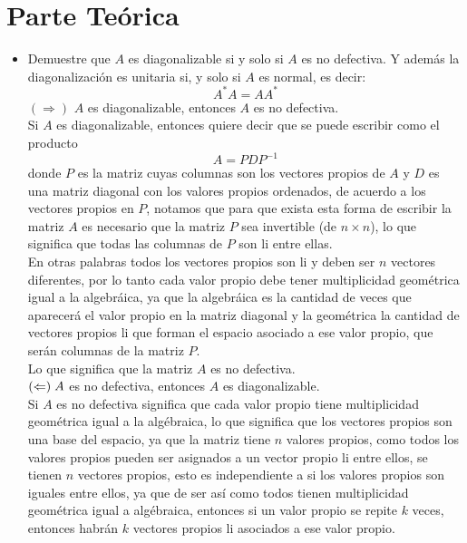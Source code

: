 \documentclass{article}
\begin{document}
\section*{Parte Teórica}
\begin{itemize}
\item Demuestre que $A$ es diagonalizable si y solo si $A$ es no defectiva. Y además la diagonalización es unitaria si, y solo si $A$ es normal, es decir:
$$A^{*}A = AA^{*} $$
\((\Rightarrow)\)
$A$ es diagonalizable, entonces $A$ es no defectiva.\\
Si $A$ es diagonalizable, entonces quiere decir que se puede escribir como el producto 
\[A = PDP^{-1}\]
donde $P$ es la matriz cuyas columnas son los vectores propios de $A$ y $D$ es una matriz diagonal con los valores propios ordenados, de acuerdo a los vectores propios en $P$, notamos que para que exista esta forma de escribir la matriz $A$ es necesario que la matriz $P$ sea invertible (de $n\times n$), lo que significa que todas las columnas de $P$ son li entre ellas.\\

En otras palabras todos los vectores propios son li y deben ser $n$ vectores diferentes, por lo tanto cada valor propio debe tener multiplicidad geométrica igual a la algebráica, ya que la algebráica es la cantidad de veces que aparecerá el valor propio en la matriz diagonal y la geométrica la cantidad de vectores propios li que forman el espacio asociado a ese valor propio, que serán columnas de la matriz $P$.\\
Lo que significa que la matriz $A$ es no defectiva.\\

\((\Leftarrow)\hspace*{1mm} A\) es no defectiva, entonces $A$ es diagonalizable.\\

Si $A$ es no defectiva significa que cada valor propio tiene multiplicidad geométrica igual a la algébraica, lo que significa que los vectores propios son una base del espacio, ya que la matriz tiene $n$ valores propios, como todos los valores propios pueden ser asignados a un vector propio li entre ellos, se tienen $n$ vectores propios, esto es independiente a si los valores propios son iguales entre ellos, ya que de ser así como todos tienen multiplicidad geométrica igual a algébraica, entonces si un valor propio se repite $k$ veces, entonces habrán $k$ vectores propios li asociados a ese valor propio.\\


\end{itemize}
\end{document}

